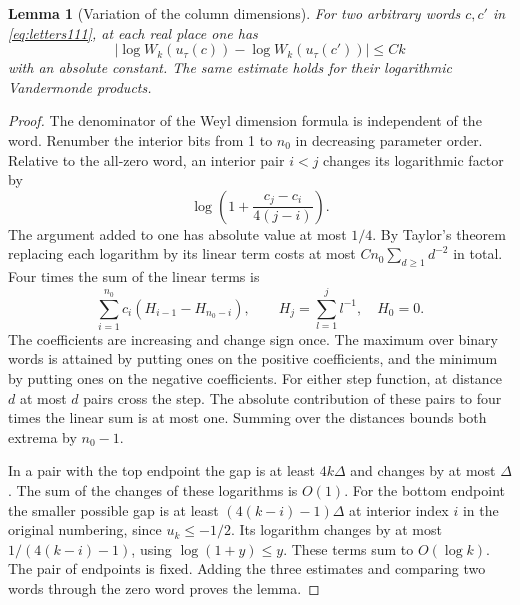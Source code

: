 \documentclass[a4paper,11pt]{article}
\newtheorem{lemma}[proposition]{Lemma}
\theoremstyle{definition}
\theoremstyle{remark}
\numberwithin{equation}{section}
\begin{document}
\begin{lemma}[Variation of the column dimensions]\label{lem:spread111}
For two arbitrary words \(c,c'\) in \eqref{eq:letters111}, at
each real place one has
\[
       \left|\log W_k(u_\tau(c))-\log W_k(u_\tau(c'))\right|\le Ck
\]
with an absolute constant. The same estimate holds for their
logarithmic Vandermonde products.
\end{lemma}
\begin{proof}
The denominator of the Weyl dimension formula is independent
of the word. Renumber the interior bits from 1 to \(n_0\) in
decreasing parameter order. Relative to the all-zero word, an
interior pair \(i<j\) changes its logarithmic factor by
\[
       \log\left(1+\frac{c_j-c_i}{4(j-i)}\right).
\]
The argument added to one has absolute value at most \(1/4\).
By Taylor's theorem replacing each logarithm by its linear
term costs at most \(C n_0\sum_{d\ge1}d^{-2}\) in total.
Four times the sum of the linear terms is
\[
        \sum_{i=1}^{n_0}c_i(H_{i-1}-H_{n_0-i}),\qquad
        H_j=\sum_{l=1}^j l^{-1},\quad H_0=0 .
\]
The coefficients are increasing and change sign once. The
maximum over binary words is attained by putting ones on the
positive coefficients, and the minimum by putting ones on
the negative coefficients. For either step function, at distance
\(d\) at most \(d\) pairs cross the step. The absolute contribution
of these pairs to four times the linear sum is at most one.
Summing over the distances bounds both extrema by \(n_0-1\).

In a pair with the top endpoint the gap is at least \(4k\Delta\)
and changes by at most \(\Delta\). The sum of the changes of
these logarithms is \(O(1)\). For the bottom endpoint the
smaller possible gap is at least \((4(k-i)-1)\Delta\) at interior
index \(i\) in the original numbering, since \(u_k\le-1/2\).
Its logarithm changes
by at most \(1/(4(k-i)-1)\), using \(\log(1+y)\le y\).
These terms sum to \(O(\log k)\). The pair of endpoints
is fixed. Adding the three estimates and comparing two words
through the zero word proves the lemma.
\end{proof}
\end{document}
